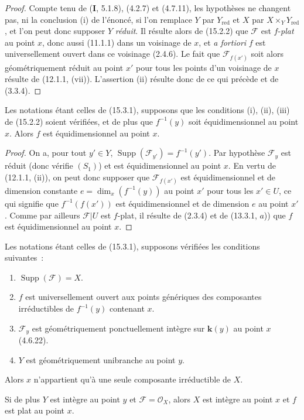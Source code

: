 \begin{proof}
Compte tenu de (\textbf{I}, 5.1.8), (4.2.7) et (4.7.11), les hypothèses ne
changent pas, ni la conclusion (i) de l'énoncé, si l'on remplace $Y$ par
$Y_{\mathrm{red}}$ et $X$ par $X\times_Y Y_{\mathrm{red}}$, et l'on peut donc
supposer $Y$ \emph{réduit}. Il résulte alors de (15.2.2) que $\mathcal F$ est
$f$-\emph{plat} au point $x$, donc aussi (11.1.1) dans un voisinage de $x$, et
\emph{a fortiori} $f$ est universellement ouvert dans ce voisinage (2.4.6). Le
fait que $\mathcal F_{f(x')}$ soit alors géométriquement réduit au point $x'$
pour tous les points d'un voisinage de $x$ résulte de (12.1.1, (vii)).
L'assertion (ii) résulte donc de ce qui précède et de (3.3.4).
\end{proof}

\begin{proposition}[15.3.2]
\label{IV.15.3.2-fr}
Les notations étant celles de \textup{(15.3.1)}, supposons que les conditions \textup{(i), (ii),
(iii)} de \textup{(15.2.2)} soient vérifiées, et de plus que $f^{-1}(y)$ soit
équidimensionnel au point $x$. Alors $f$ est équidimensionnel au point $x$.
\end{proposition}

\begin{proof}
On a, pour tout $y'\in Y$, $\operatorname{Supp}(\mathcal F_{y'})=f^{-1}(y')$.
Par hypothèse $\mathcal F_y$ est réduit (donc vérifie $(S_1)$) et est
équidimensionnel au point $x$. En vertu de (12.1.1, (ii)), on peut donc supposer
que $\mathcal F_{f(x')}$ est équidimensionnel et de dimension constante
$e=\dim_x(f^{-1}(y))$ au point $x'$ pour tous les $x'\in U$, ce qui signifie que
$f^{-1}(f(x'))$ est équidimensionnel et de dimension $e$ au point $x'$. Comme
par ailleurs $\mathcal F|U$ est $f$-plat, il résulte de (2.3.4) et de
(13.3.1, $a$)) que $f$ est équidimensionnel au point $x$.
\end{proof}

\begin{corollary}[15.3.3]
\label{IV.15.3.3-fr}
Les notations étant celles de \textup{(15.3.1)}, supposons vérifiées les conditions
suivantes~:
\begin{enumerate}[label=\textup{(\roman*)}]
  \item $\operatorname{Supp}(\mathcal F)=X$.
  \item $f$ est universellement ouvert aux points génériques des composantes
  irréductibles de $f^{-1}(y)$ contenant $x$.
  \item $\mathcal F_y$ est géométriquement ponctuellement intègre sur
  $\boldsymbol{k}(y)$ au point $x$ \textup{(4.6.22)}.
  \item $Y$ est géométriquement unibranche au point $y$.
\end{enumerate}

Alors $x$ n'appartient qu'à une seule composante irréductible de $X$.

Si de plus $Y$ est intègre au point $y$ et $\mathcal F=\mathcal O_X$, alors $X$
est intègre au point $x$ et $f$ est plat au point $x$.
\end{corollary}

